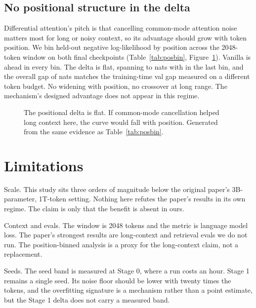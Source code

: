 \documentclass[11pt]{article}
\begin{document}
\subsection{No positional structure in the delta}
Differential attention's pitch is that cancelling common-mode attention
noise matters most for long or noisy context, so its advantage should
grow with token position. We bin held-out negative log-likelihood by
position across the 2048-token window on both final checkpoints
(Table~\ref{tab:posbin}, Figure~\ref{fig:posbin}). Vanilla is ahead in
every bin. The delta is flat, spanning \PosbinMinDelta{} to
\PosbinMaxDelta{} nats with \PosbinLastBinDelta{} in the last bin, and
the overall gap of \PosbinOverallDelta{} nats matches the training-time
val gap measured on a different token budget. No widening with
position, no crossover at long range. The mechanism's designed
advantage does not appear in this regime.

\begin{table}[tbp]
\centering

\caption{Held-out NLL by token position, both Stage 1 final
checkpoints. Positive $\delta$ favors vanilla. Generated from the
committed per-position evaluation.}
\label{tab:posbin}
\end{table}

\begin{figure}[tbp]
\centering

\caption{The positional delta is flat. If common-mode cancellation
helped long context here, the curve would fall with position. Generated
from the same evidence as Table~\ref{tab:posbin}.}
\label{fig:posbin}
\end{figure}

\FloatBarrier

\section{Limitations}
Scale. This study sits three orders of magnitude below the original
paper's 3B-parameter, 1T-token setting. Nothing here refutes the
paper's results in its own regime. The claim is only that the benefit
is absent in ours.

Context and evals. The window is 2048 tokens and the metric is language
model loss. The paper's strongest results are long-context and
retrieval evals we do not run. The position-binned analysis is a proxy
for the long-context claim, not a replacement.

Seeds. The seed band is measured at Stage 0, where a run costs an hour.
Stage 1 remains a single seed. Its noise floor should be lower with
twenty times the tokens, and the overfitting signature is a mechanism
rather than a point estimate, but the Stage 1 delta does not carry a
measured band.
\end{document}
